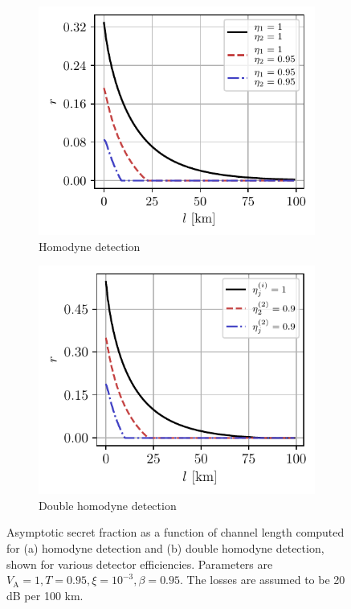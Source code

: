\documentclass[%
reprint,
superscriptaddress,
 amsmath,amssymb,amsfonts,
 aps,
 pra,
 longbibliography
]{revtex4-2}
\newcommand{\ind}[1]{\mathrm{#1}}
\begin{document}
\begin{figure}
    \centering
    \begin{subfigure}[]{.45\textwidth}
\includegraphics[width=\linewidth]{pics/qkd/hom/r(l).pdf}
\caption[]{Homodyne detection}
\label{fig:hom-r}
        \end{subfigure}
        \begin{subfigure}[]{.45\textwidth}
 \includegraphics[width=\linewidth]{pics/qkd/dhom/r(l).pdf}
\caption[]{Double homodyne detection}
\label{fig:dhom-r}
\end{subfigure}
\caption{Asymptotic secret fraction as a function of channel length computed for (a) homodyne detection and (b) double homodyne detection, shown for various detector efficiencies. Parameters are $V_{\ind{A}}=1,T=0.95,\xi=10^{-3}, \beta=0.95$. The losses are assumed to be 20 dB per 100 km.
}
\label{fig:r-of-l-all}
\end{figure}
\end{document}
